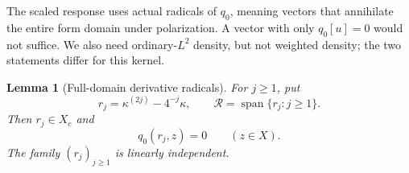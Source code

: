 \documentclass[11pt,a4paper]{article}
\numberwithin{equation}{section}
\newtheorem{lemma}[theorem]{Lemma}
\theoremstyle{remark}
\newcommand{\Rcal}{\mathcal R}
\begin{document}
The scaled response uses actual radicals of $q_0$, meaning vectors that annihilate the entire form domain under polarization. A vector with only $q_0[u]=0$ would not suffice. We also need ordinary-$L^2$ density, but not weighted density; the two statements differ for this kernel.

\begin{lemma}[Full-domain derivative radicals]\label{lem:radical}
For $j\ge1$, put
\begin{equation}\label{eq:radical}
 r_j=\kappa^{(2j)}-4^{-j}\kappa,\qquad
 \Rcal=\operatorname{span}\{r_j:j\ge1\}.
\end{equation}
Then $r_j\in X_c$ and
\begin{equation}\label{eq:radicalidentity}
 q_0(r_j,z)=0\qquad(z\in X).
\end{equation}
The family $(r_j)_{j\ge1}$ is linearly independent.
\end{lemma}
\end{document}
